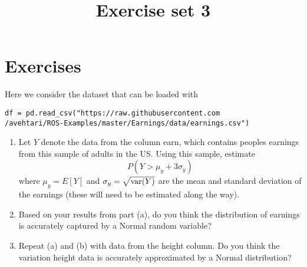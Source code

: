

\title{Exercise set 3}







\maketitle





\section{Exercises}



\begin{exercise}
Here we consider the dataset that can be loaded with 
 \begin{Verbatim}
df = pd.read_csv("https://raw.githubusercontent.com
/avehtari/ROS-Examples/master/Earnings/data/earnings.csv")
\end{Verbatim}

\begin{enumerate}[label=(\alph*)]
\item Let $Y$ denote the data from the column earn, which contains peoples earnings from this sample of adults in the US. Using this sample, estimate
\begin{equation*}
P(Y>\mu_y + 3\sigma_y)
\end{equation*}
where $\mu_y = E[Y]$ and $\sigma_y = \sqrt{{\rm var}(Y)}$ are the mean and standard deviation of the earnings (these will need to be estimated along the way). 
\item Based on your results from part (a), do you think the distribution of earnings is accurately captured by a Normal random variable? 
\item Repeat (a) and (b) with data from the height column. Do you think the variation height data is accurately approximated by a Normal distribution? 
\end{enumerate}
\end{exercise}


